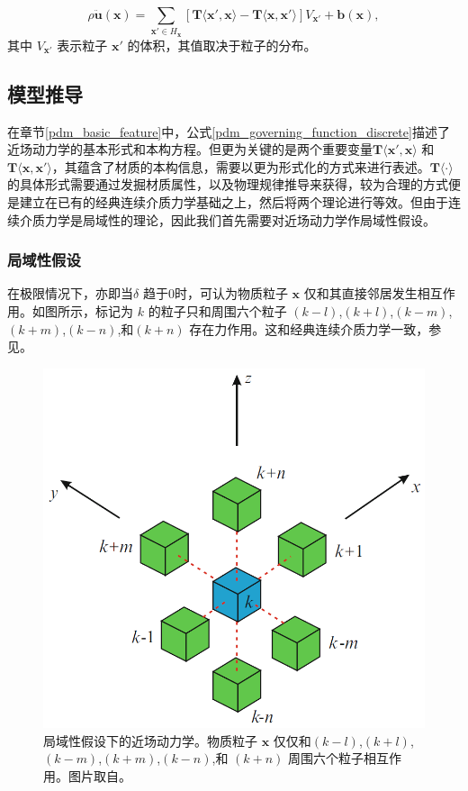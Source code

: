 \begin{equation}
\rho\ddot{\mathbf{u}}(\mathbf{x}) = \sum_{\mathbf{x}'\in H_\mathbf{x}}[\mathbf{T}\langle\mathbf{x}',\mathbf{x}\rangle - \mathbf{T}\langle\mathbf{x},\mathbf{x}'\rangle]V_{\mathbf{x}'}+\mathbf{b}(\mathbf{x}),
\label{pdm_governing_function_discrete}
\end{equation}
其中 $V_{\mathbf{x}'}$ 表示粒子 $\mathbf{x}'$ 的体积，其值取决于粒子的分布。

\subsection{模型推导}
\label{pdm_derivation}

在章节\ref{pdm_basic_feature}中，公式\ref{pdm_governing_function_discrete}描述了近场动力学的基本形式和本构方程。但更为关键的是两个重要变量$\mathbf{T}\langle\mathbf{x}',\mathbf{x}\rangle$ 和 $\mathbf{T}\langle\mathbf{x},\mathbf{x}'\rangle$，其蕴含了材质的本构信息，需要以更为形式化的方式来进行表述。$\mathbf{T}\langle\cdot\rangle$ 的具体形式需要通过发掘材质属性，以及物理规律推导来获得，较为合理的方式便是建立在已有的经典连续介质力学基础之上，然后将两个理论进行等效。但由于连续介质力学是局域性的理论，因此我们首先需要对近场动力学作局域性假设。

\subsubsection{局域性假设}
在极限情况下，亦即当$\delta$ 趋于0时，可认为物质粒子 $\mathbf{x}$ 仅和其直接邻居发生相互作用。如图所示，标记为 $k$ 的粒子只和周围六个粒子 $(k-l)$,$(k+l)$,$(k-m)$,$(k+m)$,$(k-n)$,和$(k+n)$ 存在力作用。这和经典连续介质力学一致，参见。

\begin{figure}[htbp!]
  \centering
  \captionsetup{justification=centering}
  \includegraphics[width=0.5\linewidth]{chap/image/pdm_local}

  \caption{\label{pdm_local}
           局域性假设下的近场动力学。物质粒子 $\mathbf{x}$ 仅仅和$(k-l)$,$(k+l)$,$(k-m)$,$(k+m)$,$(k-n)$,和 $(k+n)$ 周围六个粒子相互作用。图片取自。
          }
\end{figure}

